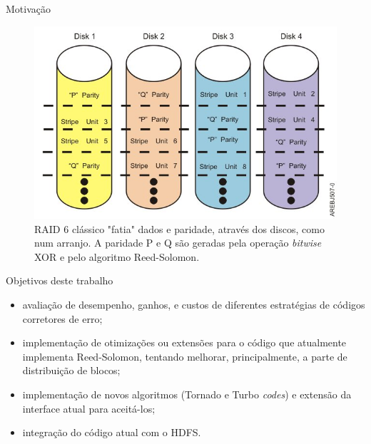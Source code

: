   \begin{frame}{Motivação}
   \begin{figure}[h]
     \centering
     \includegraphics[scale=.4]{raid6.jpg}
     \caption{RAID 6 clássico "fatia" dados e paridade, através dos discos, como num arranjo. A paridade P e Q são geradas pela operação \emph{bitwise} XOR e pelo algoritmo Reed-Solomon.\cite{IBMR6:2012}}
     \label{fig6:raid6}
   \end{figure}
  \end{frame}

  \begin{frame}{Objetivos deste trabalho}

  \begin{itemize}
     \item avaliação de desempenho, ganhos, e custos de diferentes
  estratégias de códigos corretores de erro;
     \item implementação de otimizações ou extensões para o código que
  atualmente implementa Reed-Solomon, tentando melhorar,
  principalmente, a parte de distribuição de blocos;
     \item implementação de novos algoritmos (Tornado e Turbo \emph{codes}) e
  extensão da interface atual para aceitá-los;
     \item integração do código atual com o HDFS.
     \end{itemize}
  \end{frame}
